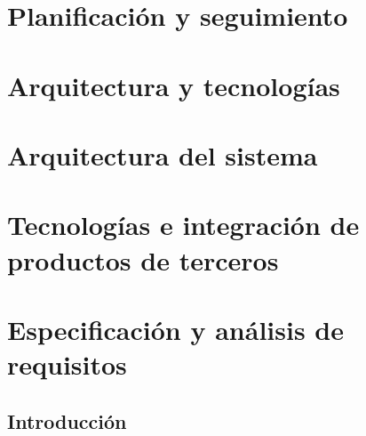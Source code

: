 \documentclass{article}
\begin{document}
\section{Planificación y seguimiento}

\section{Arquitectura y tecnologías}

\section{Arquitectura del sistema}

\section{Tecnologías e integración de productos de terceros}

\section{Especificación y análisis de requisitos}

    \subsection{Introducción}




\end{document}
